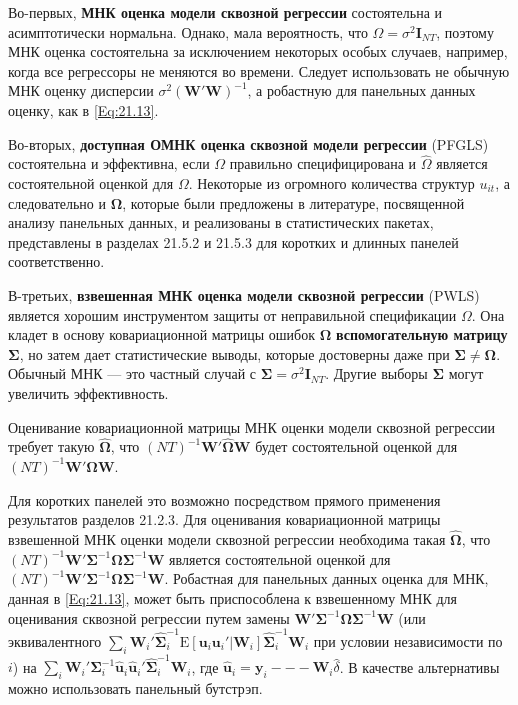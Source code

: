 Во-первых, \textbf{МНК оценка модели сквозной регрессии} состоятельна и асимптотически нормальна. Однако, мала вероятность, что $\Omega=\sigma^2 \mathbf I_{NT}$, поэтому МНК оценка состоятельна за исключением некоторых особых случаев, например, когда все регрессоры не меняются во времени.  Следует использовать не обычную МНК оценку дисперсии  $\sigma^2 (\mathbf W' \mathbf W)^{-1}$, а робастную для панельных данных оценку, как в \ref{Eq:21.13}. 

Во-вторых, \textbf{доступная ОМНК оценка сквозной модели регрессии} (PFGLS) состоятельна и эффективна, если $\Omega$ правильно специфицирована и $\hat{\Omega}$ является состоятельной оценкой для $\Omega$. Некоторые из огромного количества структур $u_{it}$, а следовательно и $\bm\Omega$, которые были предложены в литературе, посвященной анализу панельных данных, и реализованы в статистических пакетах, представлены в разделах 21.5.2 и 21.5.3 для коротких и длинных панелей соответственно.

В-третьих, \textbf{взвешенная МНК оценка модели сквозной регрессии} (PWLS) является хорошим инструментом защиты от неправильной спецификации $\Omega$. Она кладет в основу ковариационной матрицы ошибок $\bm\Omega$ \textbf{вспомогательную матрицу $\bm\Sigma$}, но затем дает статистические выводы, которые достоверны даже при $\bm\Sigma \neq \bm\Omega$. Обычный МНК --- это частный случай с $\bm\Sigma = \sigma^2 \mathbf I_{NT}$. Другие выборы $\bm\Sigma$ могут увеличить эффективность.

Оценивание ковариационной матрицы МНК оценки модели сквозной регрессии требует такую $\hat{\bm\Omega}$, что $(NT)^{-1} \mathbf W' \hat{\bm\Omega} \mathbf W$ будет состоятельной оценкой для $(NT)^{-1} \mathbf W' \bm\Omega \mathbf W$.

Для коротких панелей это возможно посредством прямого применения результатов разделов 21.2.3. Для оценивания ковариационной матрицы взвешенной МНК оценки модели сквозной регрессии необходима такая $\hat{\bm\Omega}$, что $(NT)^{-1} \mathbf W' \bm\Sigma^{-1} \hat{\bm\Omega}\bm\Sigma^{-1} \mathbf W$ является состоятельной оценкой для $(NT)^{-1} \mathbf W' \bm\Sigma^{-1} \bm\Omega \bm\Sigma^{-1} \mathbf W$. Робастная для панельных данных оценка для МНК, данная в \ref{Eq:21.13}, может быть приспособлена к взвешенному МНК для оценивания сквозной регрессии путем замены $\mathbf W' \bm\Sigma^{-1} \bm\Omega \bm\Sigma^{-1} \mathbf W$ (или эквивалентного $\sum_i \mathbf W_i' \hat{\bm\Sigma}^{-1}_i \mathrm E[\mathbf u_i \mathbf u_i' | \mathbf W_i] \hat{\bm\Sigma}^{-1}_i \mathbf W_i$ при условии независимости по $i$) на  $\sum_i \mathbf W_i' \bm\Sigma^{-1}_i \hat{\mathbf u}_i \hat{\mathbf u}_i'  \hat{\bm\Sigma}^{-1}_i \mathbf W_i$, где $\hat{\mathbf u}_i=\mathbf y_i --- \mathbf W_i \hat{\delta}$. В качестве альтернативы можно использовать панельный бутстрэп.

